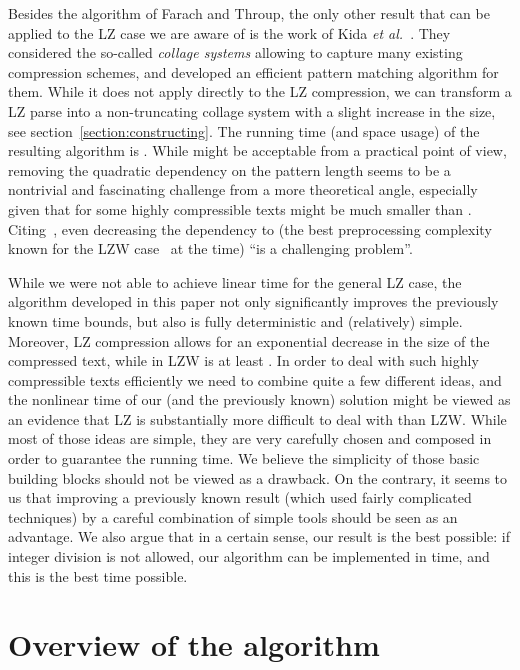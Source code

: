 \documentclass[runningheads]{llncs}
\begin{document}
Besides the algorithm of Farach and Throup, the only other result that can be applied to the LZ case we are aware of is the work of Kida \emph{et al.}~\cite{Kida}. They considered the so-called \emph{collage systems} allowing to capture many existing compression schemes, and developed an efficient pattern matching algorithm for them. While it does not apply directly to the LZ compression, we can transform a LZ parse into a non-truncating collage system with a slight increase in the size, see section~\ref{section:constructing}. The running time (and space usage) of the resulting algorithm is . While  might be acceptable from a practical point of view, removing the quadratic dependency on the pattern length seems to be a nontrivial and fascinating challenge from a more theoretical angle, especially given that for some highly compressible texts  might be much smaller than . Citing~\cite{Kida}, even decreasing the dependency to  (the best preprocessing complexity known for the LZW case~\cite{Kosaraju} at the time) ``is a challenging problem''.

While we were not able to achieve linear time for the general LZ case, the algorithm developed in this paper not only significantly improves the previously known time bounds, but also is fully deterministic and (relatively) simple. Moreover, LZ compression allows for an exponential decrease in the size of the compressed text, while in LZW  is at least . In order to deal with such highly compressible texts efficiently we need to combine quite a few different ideas, and the nonlinear time of our (and the previously known) solution might be viewed as an evidence that LZ is substantially more difficult to deal with than LZW. While most of those ideas are simple, they are very carefully chosen and composed in order to guarantee the  running time. We believe the simplicity of those basic building blocks should not be viewed as a drawback. On the contrary, it seems to us that improving a previously known result (which used fairly complicated techniques) by a careful combination of simple tools should be seen as an advantage. We also argue that in a certain sense, our result is the best possible: if integer division is not allowed, our algorithm can be implemented in  time, and this is the best time possible.

\section{Overview of the algorithm}
\end{document}
